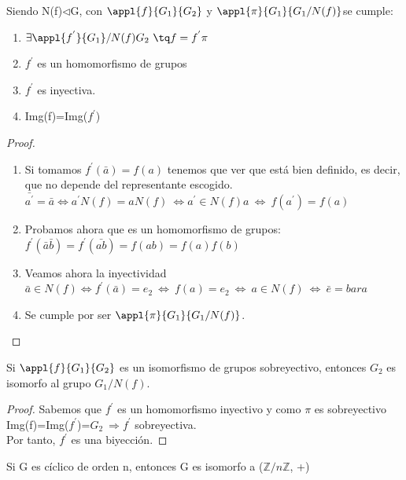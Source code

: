 \documentclass[nochap]{apuntes}
\begin{document}
\begin{theorem}
 Siendo N(f)$\lhd$G, con $\appl{f}{G_1}{G_2}$ y $\appl{\pi}{G_1}{G_1/N(f)}$se cumple:
 \begin{enumerate}
  \item $\exists \appl{f^{'}}{G_1}/N(f){G_2} \ \tq f=f^{'}\pi$
  \item $f^{'}$  es un homomorfismo de grupos
  \item $f^{'}$  es inyectiva.
  \item Img(f)=Img($f^{'}$)
 \end{enumerate}
\end{theorem}
\begin{proof}
 \begin{enumerate}
  \item Si tomamos $f^{'}(\bar{a})=f(a)$  tenemos que ver que está bien definido, es decir, que no depende del representante escogido.\\
  $\bar{a^{'}}=\bar{a} \Leftrightarrow a^{'}N(f)=aN(f) \ \Leftrightarrow a^{'}\in N(f)a \ \Leftrightarrow \ f(a^{'})=f(a)$
  \item Probamos ahora que es un homomorfismo de grupos:\\
  $ f^{'}(\bar{a}\bar{b})=f^{'}(\bar{ab})=f(ab)=f(a)f(b)$
  \item Veamos ahora la inyectividad\\
  $\bar{a}\in N(f) \Leftrightarrow f^{'}(\bar{a})=e_2 \ \Leftrightarrow \ f(a)=e_2 \ \Leftrightarrow \ a\in N(f) \ \Leftrightarrow \ \bar{e}=bar{a}$
  \item Se cumple por ser $\appl{\pi}{G_1}{G_1/N(f)}$.
 \end{enumerate}
\end{proof}

\begin{theorem}
 Si $\appl{f}{G_1}{G_2}$  es un isomorfismo de grupos sobreyectivo, entonces $G_2$  es isomorfo al grupo $G_1/N(f)$.
\end{theorem}
\begin{proof}
 Sabemos que $f^{'}$  es un homomorfismo inyectivo y como $\pi$  es sobreyectivo Img(f)=Img($f^{'}$)=$G_2 \ \Rightarrow f^{'}$ sobreyectiva.\\
 Por tanto, $f^{'}$  es una biyección.
\end{proof}
\begin{corol}
 Si G es cíclico de orden n, entonces G es isomorfo a ($\mathbb{Z}/n\mathbb{Z}$, +)
\end{corol}
\end{document}
